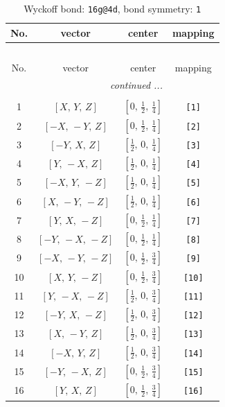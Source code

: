 \documentclass[fleqn,8pt]{jsarticle}
\begin{document}
\begin{longtable}{cccc}
\caption{Wyckoff bond: {\tt 16g@4d}, bond symmetry: {\tt 1}}
 \\
 \hline \hline
No. & vector & center & mapping \\ \hline \endfirsthead

\multicolumn{3}{l}{\tablename\ \thetable{}} \\
 \hline \hline
No. & vector & center & mapping \\ \hline \endhead

 \hline \hline
\multicolumn{3}{r}{\footnotesize\it continued ...} \\ \endfoot

 \hline \hline
\multicolumn{3}{r}{} \\ \endlastfoot

1 & $\left[ X,\, Y,\, Z \right]$ & $\left[ 0,\, \frac{1}{2},\, \frac{1}{4} \right]$ & {\tt [1]} \\ \hline
2 & $\left[ - X,\, - Y,\, Z \right]$ & $\left[ 0,\, \frac{1}{2},\, \frac{1}{4} \right]$ & {\tt [2]} \\ \hline
3 & $\left[ - Y,\, X,\, Z \right]$ & $\left[ \frac{1}{2},\, 0,\, \frac{1}{4} \right]$ & {\tt [3]} \\ \hline
4 & $\left[ Y,\, - X,\, Z \right]$ & $\left[ \frac{1}{2},\, 0,\, \frac{1}{4} \right]$ & {\tt [4]} \\ \hline
5 & $\left[ - X,\, Y,\, - Z \right]$ & $\left[ \frac{1}{2},\, 0,\, \frac{1}{4} \right]$ & {\tt [5]} \\ \hline
6 & $\left[ X,\, - Y,\, - Z \right]$ & $\left[ \frac{1}{2},\, 0,\, \frac{1}{4} \right]$ & {\tt [6]} \\ \hline
7 & $\left[ Y,\, X,\, - Z \right]$ & $\left[ 0,\, \frac{1}{2},\, \frac{1}{4} \right]$ & {\tt [7]} \\ \hline
8 & $\left[ - Y,\, - X,\, - Z \right]$ & $\left[ 0,\, \frac{1}{2},\, \frac{1}{4} \right]$ & {\tt [8]} \\ \hline
9 & $\left[ - X,\, - Y,\, - Z \right]$ & $\left[ 0,\, \frac{1}{2},\, \frac{3}{4} \right]$ & {\tt [9]} \\ \hline
10 & $\left[ X,\, Y,\, - Z \right]$ & $\left[ 0,\, \frac{1}{2},\, \frac{3}{4} \right]$ & {\tt [10]} \\ \hline
11 & $\left[ Y,\, - X,\, - Z \right]$ & $\left[ \frac{1}{2},\, 0,\, \frac{3}{4} \right]$ & {\tt [11]} \\ \hline
12 & $\left[ - Y,\, X,\, - Z \right]$ & $\left[ \frac{1}{2},\, 0,\, \frac{3}{4} \right]$ & {\tt [12]} \\ \hline
13 & $\left[ X,\, - Y,\, Z \right]$ & $\left[ \frac{1}{2},\, 0,\, \frac{3}{4} \right]$ & {\tt [13]} \\ \hline
14 & $\left[ - X,\, Y,\, Z \right]$ & $\left[ \frac{1}{2},\, 0,\, \frac{3}{4} \right]$ & {\tt [14]} \\ \hline
15 & $\left[ - Y,\, - X,\, Z \right]$ & $\left[ 0,\, \frac{1}{2},\, \frac{3}{4} \right]$ & {\tt [15]} \\ \hline
16 & $\left[ Y,\, X,\, Z \right]$ & $\left[ 0,\, \frac{1}{2},\, \frac{3}{4} \right]$ & {\tt [16]} \\
\end{longtable}
\end{document}
